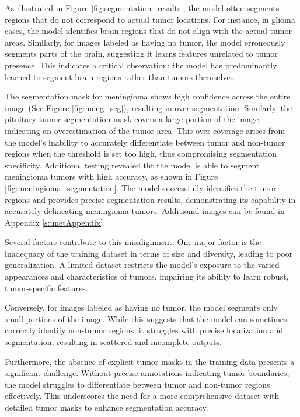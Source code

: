 As illustrated in Figure \ref{fig:segmentation_results}, the model often segments regions that do not correspond to actual tumor locations. For instance, in glioma cases, the model identifies brain regions that do not align with the actual tumor areas. Similarly, for images labeled as having no tumor, the model erroneously segments parts of the brain, suggesting it learns features unrelated to tumor presence. This indicates a critical observation: the model has predominantly learned to segment brain regions rather than tumors themselves.

The segmentation mask for meningioma shows high confidence across the entire image (See Figure \ref{fig:meng_seg}), resulting in over-segmentation. Similarly, the pituitary tumor segmentation mask covers a large portion of the image, indicating an overestimation of the tumor area. This over-coverage arises from the model's inability to accurately differentiate between tumor and non-tumor regions when the threshold is set too high, thus compromising segmentation specificity. Additional testing revealed tht the model is able to segment meningioma tumors with high accuracy, as shown in Figure \ref{fig:meningioma_segmentation}. The model successfully identifies the tumor regions and provides precise segmentation results, demonstrating its capability in accurately delineating meningioma tumors. Additional images can be found in Appendix \ref{s:unetAppendix}

Several factors contribute to this misalignment. One major factor is the inadequacy of the training dataset in terms of size and diversity, leading to poor generalization. A limited dataset restricts the model's exposure to the varied appearances and characteristics of tumors, impairing its ability to learn robust, tumor-specific features. 

Conversely, for images labeled as having no tumor, the model segments only small portions of the image. While this suggests that the model can sometimes correctly identify non-tumor regions, it struggles with precise localization and segmentation, resulting in scattered and incomplete outputs.

Furthermore, the absence of explicit tumor masks in the training data presents a significant challenge. Without precise annotations indicating tumor boundaries, the model struggles to differentiate between tumor and non-tumor regions effectively. This underscores the need for a more comprehensive dataset with detailed tumor masks to enhance segmentation accuracy.

